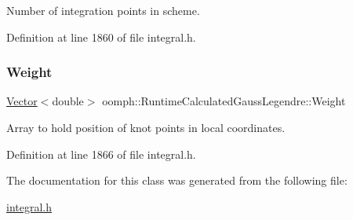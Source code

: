 Number of integration points in scheme. 



Definition at line 1860 of file integral.\+h.

\mbox{\label{classoomph_1_1RuntimeCalculatedGaussLegendre_a55a8b5efd6e88145ab43e59f66795a2d}} 
\subsubsection{\texorpdfstring{Weight}{Weight}}
{\footnotesize\ttfamily \hyperlink{classoomph_1_1Vector}{Vector}$<$double$>$ oomph\+::\+Runtime\+Calculated\+Gauss\+Legendre\+::\+Weight\hspace{0.3cm}{\ttfamily [private]}}



Array to hold position of knot points in local coordinates. 



Definition at line 1866 of file integral.\+h.



The documentation for this class was generated from the following file\+:\begin{DoxyCompactItemize}
\item 
\hyperlink{integral_8h}{integral.\+h}\end{DoxyCompactItemize}
